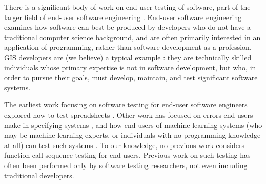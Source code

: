 There is a significant body of work on end-user testing of software,
part of the larger field of end-user software engineering
\cite{burnettEUSE,Silos}.  End-user software engineering examines how
software can best be produced by developers who do not have a
traditional computer science background, and are often primarily
interested in an application of programming, rather than software
development as a profession.  GIS developers are (we believe) a
typical example \cite{Segal07}:  they are technically skilled  individuals whose
primary expertise is not in software development, but who, in order to
pursue their goals, must develop, maintain, and test significant
software systems.

The earliest work focusing on software testing for
end-user software engineers explored how to test spreadsheets
\cite{rothermelTOSEM,rothermel2000wysiwyt}.  Other work has focused on
errors end-users make in specifying systems \cite{Phalgune}, and how
end-users of machine learning systems (who may be machine learning
experts, or individuals with no programming knowledge at all) can test
such systems \cite{OnlyOracle,kulesza-eud11,shinsel-vlhcc}.  To our
knowledge, no previous work considers function call sequence testing for
end-users.  Previous work on such testing has often been performed
only by software testing researchers, not even including traditional developers.

